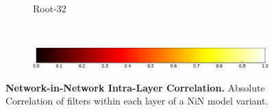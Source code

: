 \documentclass[thesis]{subfiles}
\begin{document}
{\begin{landscape}
\begin{figure}[p]
\begin{subfigure}[c]{0.97\linewidth}
					~
					~
					~
					~
					\caption{Root-32}\label{fig:corrroot32}
					\vspace*{0.6em}
				\end{subfigure}\\
				\begin{subfigure}[c]{0.97\linewidth}
    				\centering
	    			\includegraphics[width=0.4\linewidth]{Figs/PDF/colorbar}
				\end{subfigure}
				\caption[Intra-layer filter correlation.]{\textbf{Network-in-Network Intra-Layer Correlation.} Absolute Correlation of filters within each layer of a NiN model variant.}
				\label{fig:nincorr}
			\end{figure}
		\end{landscape}
		\begin{landscape}
			\begin{figure}[p]
				\begin{subfigure}[c]{0.95\linewidth}
					\centering

\end{subfigure}
\end{figure}
\end{landscape}}
\end{document}
